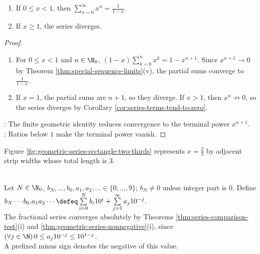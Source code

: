 \begin{theorem} \label{thm:geometric-series-nonnegative} 
\begin{enumerate}[label=(\roman*)]
\setlength{\itemsep}{0pt}
\item If $0\leq x<1$, then $\sum\limits_{n=0}^{\infty}x^n=\frac{1}{1-x}$.
\item If $x\geq1$, the series diverges.
\end{enumerate}
\begin{proof}
\begin{enumerate}[label=(\roman*)]
\setlength{\itemsep}{0pt}
\item For $0\leq x<1$ and $n\in\N_0$, $(1-x)\sum\limits_{k=0}^{n}x^k=1-x^{n+1}$. Since $x^{n+1}\to0$ by Theorem \ref{thm:special-sequence-limits}(v), the partial sums converge to $\frac{1}{1-x}$.
\item If $x=1$, the partial sums are $n+1$, so they diverge. If $x>1$, then $x^n\not\to0$, so the series diverges by Corollary \ref{cor:series-terms-tend-to-zero}.
\end{enumerate}
: The finite geometric identity reduces convergence to the terminal power $x^{n+1}$.\\
: Ratios below $1$ make the terminal power vanish.
\end{proof}
\end{theorem}

Figure \ref{fig:geometric-series-rectangle-two-thirds} represents $x=\frac{2}{3}$ by adjacent strip widths whose total length is $3$.

\begin{illustrationfigure}[H]
  \centering
  
  \caption{At $x=\frac{2}{3}$, the strip widths sum to $1+\frac{2}{3}+\frac{4}{9}+\cdots=3$.}
  \label{fig:geometric-series-rectangle-two-thirds}
\end{illustrationfigure}

\begin{definition} \label{def:real-decimal-as-series} \\
Let $N\in\N_0$, $b_N,\ldots,b_0,a_1,a_2,\ldots\in\{0,\ldots,9\}$; $b_N\neq0$ unless integer part is $0$. Define $b_N\cdots b_0.a_1a_2\cdots\defeq\sum\limits_{i=0}^{N}b_i10^i+\sum\limits_{j=1}^{\infty}a_j10^{-j}$.\\
The fractional series converges absolutely by Theorems \ref{thm:series-comparison-test}(i) and \ref{thm:geometric-series-nonnegative}(i), since $(\forall j\in\N)\,0\leq a_j10^{-j}\leq10^{1-j}$.\\
A prefixed minus sign denotes the negative of this value.
\end{definition}

